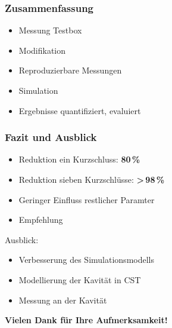 \documentclass[accentcolor=tud9b, colorbacktitle, inverttitle]{tudbeamer}
\begin{document}
\begin{frame}\frametitle{Zusammenfassung}
\begin{itemize}
	\item Messung Testbox
	\item Modifikation 
	\item Reproduzierbare Messungen
	\item Simulation
	\item Ergebnisse quantifiziert, evaluiert
\end{itemize}
\end{frame}


\begin{frame}\frametitle{Fazit und Ausblick}
\begin{itemize}
	\item Reduktion ein Kurzschluss: \textbf{80\,\%}
	\item Reduktion sieben Kurzschl\"usse:  \textbf{>\,98\,\%}
	\item Geringer Einfluss restlicher Paramter
	\item Empfehlung
\end{itemize}
Ausblick:
\begin{itemize}
	\item Verbesserung des Simulationsmodells
	\item Modellierung der Kavit\"at in CST
	\item Messung an der Kavit\"at
\end{itemize}
\end{frame}


\begin{frame}
\vspace{2cm}\hspace{2cm}
{\Large\bf Vielen Dank für Ihre Aufmerksamkeit!}
\end{frame}
% 	 
\end{document}
